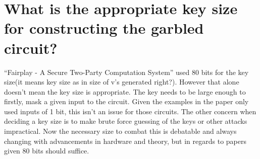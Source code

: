 \documentclass[times]{article}
\begin{document}
	\section{What is the appropriate key size for constructing the garbled circuit?}
	“Fairplay - A Secure Two-Party Computation System” used 80 bits for the key size(it means key size as in size of v’s generated right?). However that alone doesn’t mean the key size is appropriate. The key needs to be large enough to firstly, mask a given input to the circuit. Given the examples in the paper only used inputs of 1 bit, this isn’t an issue for those circuits. The other concern when deciding a key size is to make brute force guessing of the keys or other attacks impractical. Now the necessary size to combat this is debatable and always changing with advancements in hardware and theory, but in regards to papers given 80 bits should suffice.
	
	
		
\end{document}
